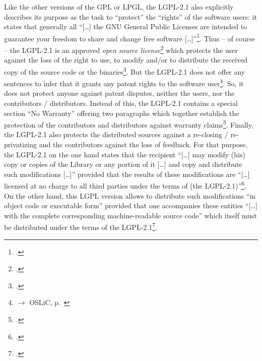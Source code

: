 Like the other versions of the GPL or LPGL, the LGPL-2.1 also explicitly
describes its purpose as the task to \enquote{protect} the \enquote{rights} of
the software users: it states that generally all \enquote{[\ldots] the GNU
General Public Licenses are intended to guarantee your freedom to share and
change free software [\ldots]}\footcite[cf.][\nopage wp.
Preamble]{Lgpl21OsiLicense1999a}. Thus -- of course -- the LGPL-2.1 is an approved
\emph{open source license}\footcite[cf.][\nopage wp]{OSI2012b} which protects
the user against the loss of the right to use, to modify and/or to distribute
the received copy of the source code or the binaries\footcite[cf.][\nopage wp. 
§1, §2, §4]{Lgpl21OsiLicense1999a}. But the LGPL-2.1 does not offer any
sentences to infer that it grants any patent rights to the software
user\footnote{$\rightarrow$ OSLiC, p.\ \pageref{subsec:Lgpl21PatentClause}}. So,
it does not protect anyone against patent disputes, neither the users, nor the
contributors / distributors. Instead of this, the LGPL-2.1 contains a special
section \enquote{No Warranty} offering two paragraphs which together establish
the protection of the contributors and distributors against warranty
claims\footcite[cf.][\nopage wp. §15, §16]{Lgpl21OsiLicense1999a}. Finally, the
LGPL-2.1 also protects the distributed sources against a re-closing /
re-privatizing and the contributors against the loss of feedback. For that
purpose, the LGPL-2.1 on the one hand states that the recipient
\enquote{[\ldots] may modify (his) copy or copies of the Library or any portion
of it [\ldots] and copy and distribute such modifications [\ldots]} provided
that the results of these modifications are \enquote{[\ldots] licensed at no
charge to all third parties under the terms of (the
LGPL-2.1)}\footcite[cf.][\nopage wp. §2]{Lgpl21OsiLicense1999a}. On the other
hand, this LGPL version allows to distribute such modifications \enquote{in
object code or executable form} provided that one accompanies these entities
\enquote{[\ldots] with the complete corresponding machine-readable source code}
which itself must be distributed under the terms of the
LGPL-2.1\footcite[cf.][\nopage wp. §4]{Lgpl21OsiLicense1999a}.


